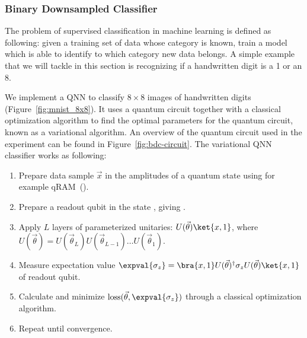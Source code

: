\documentclass[a4paper,10pt]{article}
\DeclareMathOperator{\loss}{loss}
\begin{document}
\subsubsection{Binary Downsampled Classifier} \label{sec:bdc}
The problem of supervised classification in machine learning is defined as following: given a training set of data whose category is known, train a model which is able to identify to which category new data belongs.
A simple example that we will tackle in this section is recognizing if a handwritten digit is a 1 or an 8.

We implement a QNN to classify $8 \times 8$ images of handwritten digits (Figure~\ref{fig:mnist_8x8}).
It uses a quantum circuit together with a classical optimization algorithm to find the optimal parameters for the quantum circuit, known as a variational algorithm.
An overview of the quantum circuit used in the experiment can be found in Figure~\ref{fig:bdc-circuit}.
The variational QNN classifier works as following:
\begin{enumerate}
	\item Prepare data sample $\vec{x}$ in the amplitudes of a quantum state  using for example qRAM~(\cite{qram}).
	\item Prepare a readout qubit in the state , giving .
	\item Apply $L$ layers of parameterized unitaries: $U(\vec{\theta})\ket{x, 1}$, where $U(\vec{\theta}) = U(\vec{\theta}_L) U(\vec{\theta}_{L-1}) \ldots U(\vec{\theta}_1)$.
	\item Measure expectation value $\expval{\sigma_z} = \bra{x, 1}U(\vec{\theta})^\dagger \sigma_z U(\vec{\theta})\ket{x, 1}$ of readout qubit.
	\item Calculate and minimize $\loss(\vec{\theta}, \expval{\sigma_z})$ through a classical optimization algorithm.
	\item Repeat until convergence.
\end{enumerate}
\end{document}
